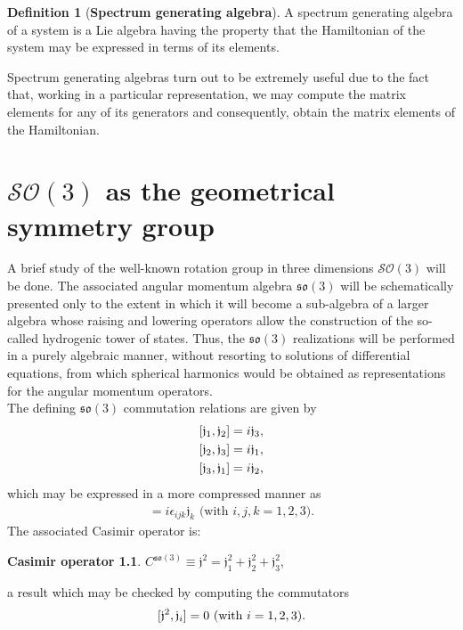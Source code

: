 \documentclass[12pt,a4paper]{report}
\theoremstyle{definition}
\newtheorem{definition}{Definition}
\newtheorem*{casimir}{Casimir operator}
\theoremstyle{remark}
\theoremstyle{remark}
\begin{document}
\begin{definition}[\textbf{Spectrum generating algebra}]
A spectrum generating algebra of a system  is a Lie algebra having the property that the Hamiltonian of the system may be expressed in terms of its elements.
\end{definition}
Spectrum generating algebras turn out to be extremely useful due to the fact that, working in a particular representation, we may compute the matrix elements for any of its generators and consequently, obtain the matrix elements of the Hamiltonian. 



\chapter{$\mathcal{SO}(3)$ as the geometrical symmetry group}
A brief study of the well-known rotation group in three dimensions $\mathcal{SO}(3)$ will be done. The associated angular momentum algebra $\mathfrak{so}(3)$ will be schematically presented only to the extent in which it will become a sub-algebra of a larger algebra whose raising and lowering operators allow the construction of the so-called hydrogenic tower of states. Thus, the $\mathfrak{so}(3)$ realizations will be performed in a purely algebraic manner, without resorting to solutions of differential equations, from which spherical harmonics would be obtained as representations for the angular momentum operators. \\ 
The defining $\mathfrak{so}(3)$ commutation relations are given by
\begin{equation}\label{eso3.1}
\begin{aligned}\relax
[\mathfrak{j}_1,\mathfrak{j}_2]&=i\mathfrak{j}_3,\\
[\mathfrak{j}_2,\mathfrak{j}_3]&=i\mathfrak{j}_1,\\
[\mathfrak{j}_3,\mathfrak{j}_1]&=i\mathfrak{j}_2,
\end{aligned}
\end{equation}
which may be expressed in a more compressed manner as
\begin{align*}
[\mathfrak{j}_i,\mathfrak{j}_j]=i\epsilon_{ijk}\mathfrak{j}_k \text{ (with }i,j,k=1,2,3).
\end{align*}
The associated Casimir operator is:
\begin{casimir} $C^{\mathfrak{so}(3)}\equiv\mathfrak{j}^2=\mathfrak{j}_1^2+\mathfrak{j}_2^2+\mathfrak{j}_3^2$,
\end{casimir}\noindent
a result which may be checked by computing the commutators
\begin{equation}\label{eso3.3}
\begin{aligned}\relax
[\mathfrak{j}^2,\mathfrak{j}_i]=0\text{ (with }i=1,2,3).
\end{aligned}
\end{equation}
\end{document}
